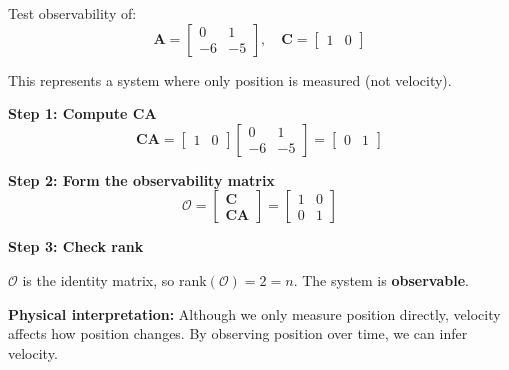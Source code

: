 \begin{example}
\label{ex:observability_test}
Test observability of:
\begin{equation}
\mathbf{A} = \begin{bmatrix} 0 & 1 \\ -6 & -5 \end{bmatrix}, \quad \mathbf{C} = \begin{bmatrix} 1 & 0 \end{bmatrix}
\end{equation}

This represents a system where only position is measured (not velocity).

\textbf{Step 1: Compute $\mathbf{C}\mathbf{A}$}
\begin{equation}
\mathbf{C}\mathbf{A} = \begin{bmatrix} 1 & 0 \end{bmatrix}\begin{bmatrix} 0 & 1 \\ -6 & -5 \end{bmatrix} = \begin{bmatrix} 0 & 1 \end{bmatrix}
\end{equation}

\textbf{Step 2: Form the observability matrix}
\begin{equation}
\mathcal{O} = \begin{bmatrix} \mathbf{C} \\ \mathbf{C}\mathbf{A} \end{bmatrix} = \begin{bmatrix} 1 & 0 \\ 0 & 1 \end{bmatrix}
\end{equation}

\textbf{Step 3: Check rank}

$\mathcal{O}$ is the identity matrix, so rank$(\mathcal{O}) = 2 = n$. The system is \textbf{observable}.

\textbf{Physical interpretation:} Although we only measure position directly, velocity affects how position changes. By observing position over time, we can infer velocity.
\end{example}


